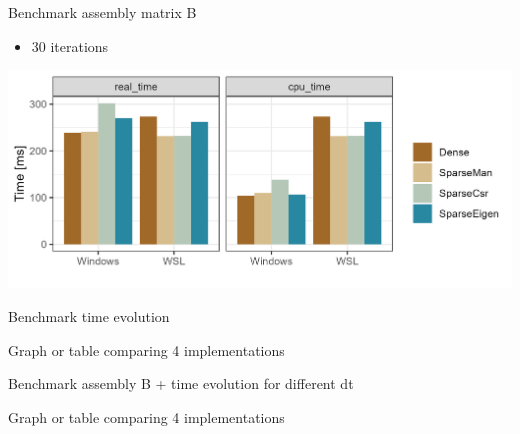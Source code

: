 \documentclass[aspectratio=169,xcolor=dvipsnames]{beamer}
\begin{document}
\begin{frame}{Benchmark assembly matrix B}
   
    \begin{itemize}
        \item 30 iterations
    \end{itemize}
    
    \begin{center}
   \includegraphics[width=0.8\linewidth]{assembly_bench_result.png}
   \end{center}
   
\end{frame}


\begin{frame}{Benchmark time evolution}
   
   Graph or table comparing 4 implementations
   
\end{frame}


\begin{frame}{Benchmark assembly B + time evolution for different dt }
   
   Graph or table comparing 4 implementations
   
\end{frame}

\end{document}
